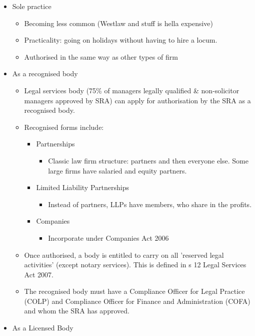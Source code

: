 \documentclass[
]{article}
\providecommand{\tightlist}{%
  \setlength{\itemsep}{0pt}\setlength{\parskip}{0pt}}
\begin{document}
\begin{itemize}
\tightlist
\item
  Sole practice

  \begin{itemize}
  \tightlist
  \item
    Becoming less common (Westlaw and stuff is hella expensive)
  \item
    Practicality: going on holidays without having to hire a locum.
  \item
    Authorised in the same way as other types of firm
  \end{itemize}
\item
  As a recognised body

  \begin{itemize}
  \tightlist
  \item
    Legal services body (75\% of managers legally qualified \&
    non-solicitor managers approved by SRA) can apply for authorisation
    by the SRA as a recognised body.
  \item
    Recognised forms include:

    \begin{itemize}
    \tightlist
    \item
      Partnerships

      \begin{itemize}
      \tightlist
      \item
        Classic law firm structure: partners and then everyone else.
        Some large firms have salaried and equity partners.
      \end{itemize}
    \item
      Limited Liability Partnerships

      \begin{itemize}
      \tightlist
      \item
        Instead of partners, LLPs have members, who share in the
        profits.
      \end{itemize}
    \item
      Companies

      \begin{itemize}
      \tightlist
      \item
        Incorporate under Companies Act 2006
      \end{itemize}
    \end{itemize}
  \item
    Once authorised, a body is entitled to carry on all 'reserved legal
    activities' (except notary services). This is defined in s 12 Legal
    Services Act 2007.
  \item
    The recognised body must have a Compliance Officer for Legal
    Practice (COLP) and Compliance Officer for Finance and
    Administration (COFA) and whom the SRA has approved.
  \end{itemize}
\item
  As a Licensed Body


\end{itemize}
\end{document}
